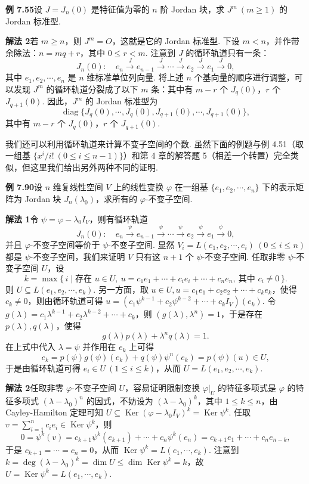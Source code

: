 \documentclass[UTF8, 12pt, fontset=fandol, oneside]{ctexart}
\begin{document}
\noindent\textbf{例 7.55}\quad 设 $J=J_n(0)$ 是特征值为零的 $n$ 阶 Jordan 块，求 $J^m\ (m\ge1)$ 的 Jordan 标准型.

\noindent\textbf{解法 2}\quad 若 $m\ge n$，则 $J^m=O$，这就是它的 Jordan 标准型. 下设 $m<n$，并作带余除法：$n=mq+r$，其中 $0\le r<m$. 注意到 $J$ 的循环轨道只有一条：
\[
J_n(0):\quad e_n\xrightarrow{J}e_{n-1}\xrightarrow{J}\cdots\xrightarrow{J}e_2\xrightarrow{J}e_1\xrightarrow{J}0,
\]
其中 $e_1,e_2,\cdots,e_n$ 是 $n$ 维标准单位列向量. 将上述 $n$ 个基向量的顺序进行调整，可以发现 $J^m$ 的循环轨道分裂成了以下 $m$ 条：其中有 $m-r$ 个 $J_q(0)$，$r$ 个 $J_{q+1}(0)$. 因此，$J^m$ 的 Jordan 标准型为
\[
\operatorname{diag}\{J_q(0),\cdots,J_q(0),J_{q+1}(0),\cdots,J_{q+1}(0)\},
\]
其中有 $m-r$ 个 $J_q(0)$，$r$ 个 $J_{q+1}(0)$.

我们还可以利用循环轨道来计算不变子空间的个数. 虽然下面的例题与例 4.51（取一组基 $\{x^i/i!\ (0\le i\le n-1)\}$）和第 4 章的解答题 5（相差一个转置）完全类似，但这里我们给出另外两种不同的证明.

\noindent\textbf{例 7.90}\quad 设 $n$ 维复线性空间 $V$ 上的线性变换 $\varphi$ 在一组基 $\{e_1,e_2,\cdots,e_n\}$ 下的表示矩阵为 Jordan 块 $J_n(\lambda_0)$，求所有的 $\varphi$-不变子空间.

\noindent\textbf{解法 1}\quad 令 $\psi=\varphi-\lambda_0I_V$，则有循环轨道
\[
J_n(0):\quad e_n\xrightarrow{\psi}e_{n-1}\xrightarrow{\psi}\cdots\xrightarrow{\psi}e_2\xrightarrow{\psi}e_1\xrightarrow{\psi}0,
\]
并且 $\varphi$-不变子空间等价于 $\psi$-不变子空间. 显然 $V_i=L(e_1,e_2,\cdots,e_i)\ (0\le i\le n)$ 都是 $\psi$-不变子空间，我们来证明 $V$ 只有这 $n+1$ 个 $\psi$-不变子空间. 任取非零 $\psi$-不变子空间 $U$，设
\[
k=\max\{\,i\mid \text{存在 }u\in U,\ u=c_1e_1+\cdots+c_ie_i+\cdots+c_ne_n,\ \text{其中 }c_i\ne0\,\}.
\]
则 $U\subseteq L(e_1,e_2,\cdots,e_k)$. 另一方面，取 $u\in U,u=c_1e_1+c_2e_2+\cdots+c_ke_k$，使得 $c_k\ne0$，则由循环轨道可得 $u=(c_1\psi^{k-1}+c_2\psi^{k-2}+\cdots+c_kI_V)(e_k)$. 令 $g(\lambda)=c_1\lambda^{k-1}+c_2\lambda^{k-2}+\cdots+c_k$，则 $(g(\lambda),\lambda^n)=1$，于是存在 $p(\lambda),q(\lambda)$，使得
\[
g(\lambda)p(\lambda)+\lambda^nq(\lambda)=1.
\]
在上式中代入 $\lambda=\psi$ 并作用在 $e_k$ 上可得
\[
e_k=p(\psi)g(\psi)(e_k)+q(\psi)\psi^n(e_k)=p(\psi)(u)\in U,
\]
于是由循环轨道可得 $e_i\in U\ (1\le i\le k)$，从而 $U=L(e_1,e_2,\cdots,e_k)$.

\noindent\textbf{解法 2}\quad 任取非零 $\varphi$-不变子空间 $U$，容易证明限制变换 $\varphi|_U$ 的特征多项式是 $\varphi$ 的特征多项式 $(\lambda-\lambda_0)^n$ 的因式，不妨设为 $(\lambda-\lambda_0)^k$，其中 $1\le k\le n$，由 Cayley-Hamilton 定理可知 $U\subseteq\operatorname{Ker}(\varphi-\lambda_0I_V)^k=\operatorname{Ker}\psi^k$. 任取 $v=\sum_{i=1}^nc_ie_i\in\operatorname{Ker}\psi^k$，则
\[
0=\psi^k(v)=c_{k+1}\psi^k(e_{k+1})+\cdots+c_n\psi^k(e_n)=c_{k+1}e_1+\cdots+c_ne_{n-k},
\]
于是 $c_{k+1}=\cdots=c_n=0$，从而 $\operatorname{Ker}\psi^k=L(e_1,\cdots,e_k)$. 注意到 $k=\deg(\lambda-\lambda_0)^k=\dim U\le\dim\operatorname{Ker}\psi^k=k$，故 $U=\operatorname{Ker}\psi^k=L(e_1,\cdots,e_k)$.
\end{document}

